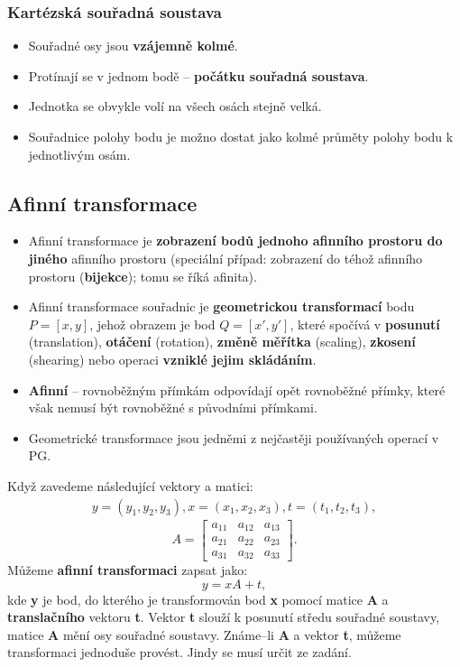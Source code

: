 \subsubsection{Kartézská souřadná soustava}
\begin{itemize}
	\item Souřadné osy jsou \textbf{vzájemně kolmé}.
	\item Protínají se v jednom bodě -- \textbf{počátku souřadná soustava}.
	\item Jednotka se obvykle volí na všech osách stejně velká.
	\item Souřadnice polohy bodu je možno dostat jako kolmé průměty polohy bodu k jednotlivým osám.
\end{itemize}

\subsection{Afinní transformace}
\begin{itemize}
	\item Afinní transformace je \textbf{zobrazení bodů jednoho afinního prostoru do jiného} afinního prostoru (speciální případ: zobrazení do téhož afinního prostoru (\textbf{bijekce}); tomu se říká afinita).
	\item Afinní transformace souřadnic je \textbf{geometrickou transformací} bodu $P=[x,y]$, jehož obrazem je bod $Q=[x',y']$, které spočívá v \textbf{posunutí} (translation), \textbf{otáčení} (rotation), \textbf{změně měřítka} (scaling), \textbf{zkosení} (shearing) nebo operaci \textbf{vzniklé jejim skládáním}.
	\item \textbf{Afinní} -- rovnoběžným přímkám odpovídají opět rovnoběžné přímky, které však nemusí být rovnoběžné s původními přímkami.
	\item Geometrické transformace jsou jedněmi z nejčastěji používaných operací v PG.
\end{itemize}
Když zavedeme následující vektory a matici:
\begin{equation*}
\begin{aligned}
 y = (y_1,y_2,y_3),  x = (x_1,x_2,x_3), t = (t_1,t_2,t_3),
 \end{aligned}
\end{equation*}
\begin{equation*}
 A = \begin{bmatrix}
     a_{11} & a_{12}  & a_{13}      \\[0.3em]
     a_{21} & a_{22}  & a_{23}      \\[0.3em]
     a_{31} & a_{32}  & a_{33} 
     \end{bmatrix}.
\end{equation*}
Můžeme \textbf{afinní transformaci} zapsat jako:
\begin{equation*}
 y = xA + t,
\end{equation*}
kde \textbf{y} je bod, do kterého je transformován bod \textbf{x} pomocí matice \textbf{A} a \textbf{translačního} vektoru \textbf{t}. Vektor \textbf{t} slouží k posunutí středu souřadné soustavy, matice \textbf{A} mění osy souřadné soustavy. Známe--li \textbf{A} a vektor \textbf{t}, můžeme transformaci jednoduše provést. Jindy se musí určit ze zadání.

